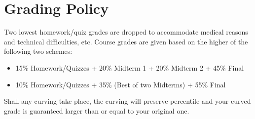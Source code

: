 \documentclass[11pt]{article}
\begin{document}
\section*{Grading Policy}
Two lowest homework/quiz grades are dropped to accommodate medical reasons and technical difficulties, etc. Course grades are given based on the higher of the following two schemes:
\begin{itemize}
  \item 15\% Homework/Quizzes + 20\% Midterm 1 + 20\% Midterm 2 + 45\% Final
  \item 10\% Homework/Quizzes + 35\% (Best of two Midterms) + 55\% Final
\end{itemize}
Shall any curving take place, the curving will preserve percentile and your curved grade is guaranteed larger than or equal to your original one.
\end{document}
